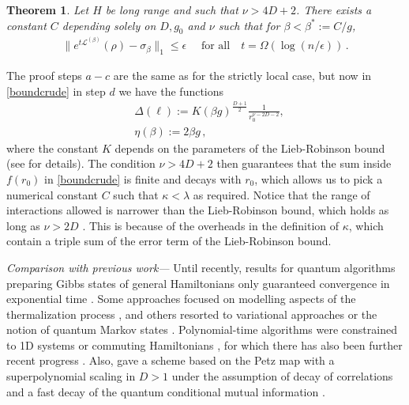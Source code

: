 \documentclass[aps,pra,amsmath,amssymb,twocolumn,10pt]{revtex4-2}
\newtheorem{thm}{Theorem}
\theoremstyle{definition}
\begin{document}
\begin{thm}\label{thm.longrange}
Let $H$ be long range  and such that $\nu>4D+2$. There exists a constant $C$ 
depending solely on $D, g_0$ and $\nu$ such that for $\beta < \beta^*:= C/g $,
\begin{align}\label{equ:mixing_gap}
\|e^{t\mathcal{L}^{(\beta)}}(\rho)-\sigma_\beta\|_1\le \epsilon\quad \text{ for all}\quad t=\Omega(\log(n/\epsilon))\,.
\end{align}

\end{thm}

The proof steps $a-c$ are the same as for the strictly local case, but now in \eqref{boundcrude} in step $d$ we have the functions
\begin{align*}
&\Delta(\ell):= K  (\beta g)^{\frac{D+1}{2}} \frac{1}{r_0^{\nu -2D-2 }} , \\ 
  &  \eta(\beta) := 2 \beta g \,,
\end{align*}
where the constant $K$ depends on the parameters of the Lieb-Robinson bound \cite{Kuwahara2019LongRange} (see \cite{supplemental} for details). The condition $\nu > 4D+2 $ then guarantees that the sum inside $f(r_0)$ in \eqref{boundcrude} is finite and decays with $r_0$, which allows us to pick a numerical constant $C$ such that $\kappa<\lambda$ as required. Notice that the range of interactions allowed is narrower than the Lieb-Robinson bound, which holds as long as $\nu > 2D$ \cite{LR_Anthony_Chen_2023}. This is because of the overheads in the definition of $\kappa$, which contain a triple sum of the error term of the Lieb-Robinson bound. 

\emph{Comparison with previous work—} Until recently, results for quantum algorithms preparing Gibbs states of general Hamiltonians only guaranteed convergence in exponential time \cite{poulin_sampling_2009,Temme_2011,chowdhury2016quantum,shtanko2021algorithms,Holmes_2022,zhang2023dissipative}. Some approaches focused on modelling aspects of the thermalization process \cite{chen2023fast,LiWang2023,Rall_2023}, and others resorted to variational approaches \cite{chowdhury_variational_2020,wang_variational_2021} or the notion of quantum Markov states \cite{brandao2019finite}. Polynomial-time algorithms were constrained to 1D systems \cite{bilgin_preparing_2010} or commuting Hamiltonians \cite{GeMolnar2016,kastoryano2016quantum,bardet2023rapid,bardet2024entropy}, for which there has also been further recent progress \cite{ding2024polynomial,hwang2024gibbscommuting}. Also, \cite{brandao2019finite} gave a scheme based on the Petz map with a superpolynomial scaling in $D>1$ under the assumption of decay of correlations and a fast decay of the quantum conditional mutual information \cite{kuwahara2024clustering}.
\end{document}

